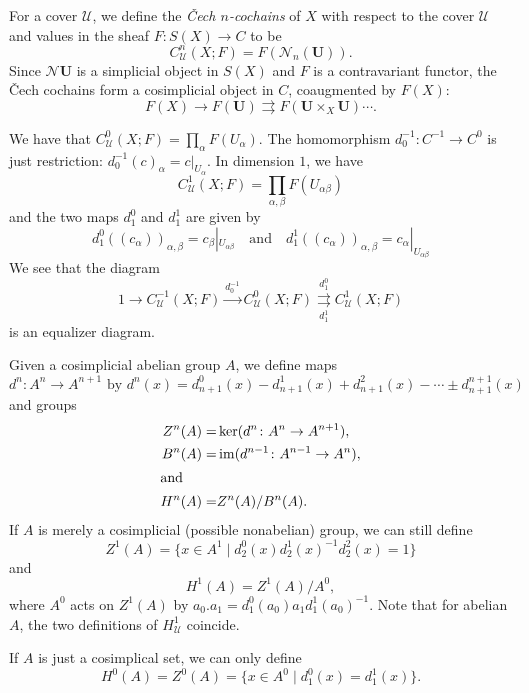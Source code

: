\documentclass[a4paper,openany]{scrbook}
\newcommand{\nerve}{\mathcal N}
\begin{document}
\begin{defn}
For a cover $\mathcal U$, we define the \emph{Čech $n$-cochains} of $X$ with respect to the cover $\mathcal U$ and values in the sheaf $F\colon S(X) \to C$ to be
\[
C^n_{\mathcal U}(X;F) =  F(\nerve_n(\mathbf U)).
\]
Since $\nerve \mathbf U$ is a simplicial object in $S(X)$ and $F$ is a contravariant functor, the Čech cochains form a cosimplicial object in $C$, coaugmented by $F(X)$:
\[
F(X) \to F(\mathbf U) \rightrightarrows F(\mathbf U \times_X \mathbf U) \cdots.
\]
\end{defn}

\begin{example}
We have that $C^{0}_{\mathcal U}(X;F) = \prod_{\alpha} F(U_\alpha)$. The homomorphism $d^{-1}_0\colon C^{-1} \to C^0$ is just restriction: $d^{-1}_0(c)_{\alpha} = c|_{U_\alpha}$. In dimension $1$, we have
\[
C^1_{\mathcal U}(X;F) = \prod_{\alpha,\beta} F(U_{\alpha\beta})
\]
and the two maps $d^0_1$ and $d^1_1$ are given by
\[
d^0_1((c_\alpha))_{\alpha,\beta} = c_\beta|_{U_{\alpha\beta}} \quad \text{and} \quad d^1_1((c_\alpha))_{\alpha,\beta} = c_\alpha|_{U_{\alpha\beta}}
\]
We see that the diagram
\[
1 \to C^{-1}_{\mathcal U}(X;F) \xrightarrow{d^{-1}_0} C^{0}_{\mathcal U}(X;F) \overset{d^0_1}{\underset{d^1_1}{\rightrightarrows}} C^1_{\mathcal U}(X;F)
\]
is an equalizer diagram.
\end{example}

\begin{defn}
Given a cosimplicial abelian group $A$, we define maps
\[
d^n\colon A^{n} \to A^{n+1} \text{ by } d^n(x) = d^0_{n+1}(x)-d^1_{n+1}(x)+d^2_{n+1}(x)-\cdots\pm d^{n+1}_{n+1}(x)
\]
and groups
\begin{align*}
Z^n(A) =& \ker(d^n\colon A^n \to A^{n+1}),\\
B^n(A) =& \operatorname{im}(d^{n-1}\colon A^{n-1} \to A^{n}),\\
\intertext{and}
H^n(A) =& Z^n(A)/B^n(A).
\end{align*}
If $A$ is merely a cosimplicial (possible nonabelian) group, we can still define
\[
Z^1(A) = \{x \in A^1 \mid d^0_2(x)d^1_2(x)^{-1}d^2_2(x)=1\}
\]
and
\[
H^1(A) = Z^1(A)/A^0,
\]
where $A^0$ acts on $Z^1(A)$ by $a_0.a_1 = d^0_1(a_0) a_1 d^1_1(a_0)^{-1}$. Note that for abelian $A$, the two definitions of $H^1_{\mathcal U}$ coincide.

If $A$ is just a cosimplical set, we can only define
\[
H^0(A) = Z^0(A) = \{x \in A^0 \mid d^0_1(x) = d^1_1(x)\}.
\]
\end{defn}
\end{document}
